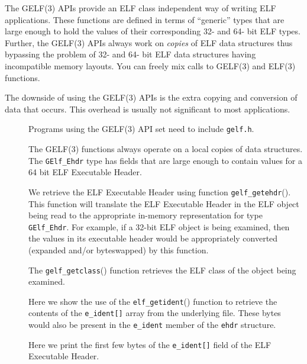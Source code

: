 \documentclass[a4paper]{book}
\makeatletter
\newcommand{\function}[1]{\texttt{#1}()}
\newcommand{\filename}[1]{\texttt{#1}}
\newcommand{\parameter}[1]{\texttt{#1}}
\newcommand{\type}[1]{\texttt{#1}}
\newenvironment{callout}[2][blue]{%
  \begingroup\newcommand{\@cocolor}{#1}%
  \newcommand{\@cogroup}[1]{#2}}{\endgroup}
\newcommand{\@co}[1]{\framebox{\textbf{\color{\@cocolor}#1}}}
\newcommand{\coref}[1]{%
  \hypertarget{\@cogroup.#1.cr}{%
    \hyperlink{\@cogroup.#1.co}{\@co{#1}}}}
\makeatother
\begin{document}
The GELF(3) APIs provide an ELF class independent way of writing ELF
applications.  These functions are defined in terms of ``generic''
types that are large enough to hold the values of their corresponding
32- and 64- bit ELF types.  Further, the GELF(3) APIs always work on
\emph{copies} of ELF data structures thus bypassing the
problem of 32- and 64- bit ELF data structures having incompatible
memory layouts.  You can freely mix calls to GELF(3) and ELF(3)
functions.

The downside of using the GELF(3) APIs is the extra copying and
conversion of data that occurs.  This overhead is usually not
significant to most applications.

\begin{callout}{prog2}
  

  \begin{description}
  \item[\coref{1}] Programs using the GELF(3) API set need to include
    \filename{gelf.h}.

  \item[\coref{2}] The GELF(3) functions always operate on a local
    copies of data structures.  The \type{GElf\_Ehdr} type has fields
    that are large enough to contain values for a 64 bit ELF
    Executable Header.

  \item[\coref{3}] We retrieve the ELF Executable Header using
    function \function{gelf\_getehdr}.  This function will translate
    the ELF Executable Header in the ELF object being read to the
    appropriate in-memory representation for type \type{GElf\_Ehdr}.
    For example, if a 32-bit ELF object is being examined, then the
    values in its executable header would be appropriately converted
    (expanded and/or byteswapped) by this function.

  \item[\coref{4}] The \function{gelf\_getclass} function retrieves
    the ELF class of the object being examined.

  \item[\coref{5}] Here we show the use of the
    \function{elf\_getident} function to retrieve the contents of the
    \parameter{e\_ident[]} array from the underlying file.  These
    bytes would also be present in the \parameter{e\_ident} member of
    the \parameter{ehdr} structure.

    Here we print the first few bytes of the \parameter{e\_ident[]}
    field of the ELF Executable Header.


\end{description}
\end{callout}
\end{document}
